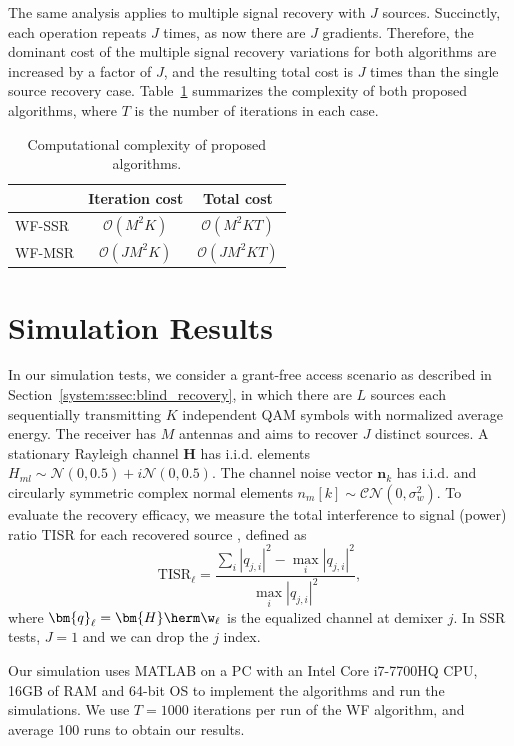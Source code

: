 The same analysis applies to multiple signal recovery with $J$ sources. 
Succinctly, each operation repeats $J$ times, as now there are $J$ gradients. 
Therefore, the dominant cost of the multiple signal recovery variations for both algorithms 
are increased by a factor of $J$, and the resulting total cost is $J$ times than the single source recovery case. 
Table~\ref{wfcma:table:complexity} summarizes the complexity of both proposed algorithms, where $T$ is the number of iterations in each case.
\begin{table}[htb]
\caption{Computational complexity of proposed algorithms.}\label{wfcma:table:complexity}
\centering
\begin{tabular}{l|cc}
	& Iteration cost & Total cost\\\hline
	WF-SSR&  $\mathcal{O}(M^2 K)$  & $\mathcal{O}(M^2 K T)$  \\
	WF-MSR&  $\mathcal{O}(JM^2K)$  & $\mathcal{O}(JM^2KT)$  \\
\end{tabular}
\end{table}

\section{Simulation Results} \label{wfcma:Simulations}
In our simulation tests, we consider a grant-free access scenario as described in Section~\ref{system:ssec:blind_recovery}, in which there are $L$ sources each sequentially transmitting $K$ independent QAM symbols with normalized average energy. 
The receiver has $M$ antennas and aims to recover $J$ distinct sources.
A stationary Rayleigh channel $\bm{H}$ has i.i.d. elements $H_{ml}\sim\mathcal{N}(0,0.5)+i\mathcal{N}(0,0.5)$.
The channel noise vector $\bm{n}_k$ has i.i.d. and circularly symmetric complex normal elements  $n_m[k]\sim \mathcal{CN}(0,\sigma_w^2)$.
To evaluate the recovery efficacy, we measure the total interference to signal (power) ratio TISR for each recovered source \cite{Ding2000}, defined as
\begin{equation}
\mathrm{TISR}_{\ell}=\frac{\sum_i |q_{j,i}|^2- \max_i |q_{j,i}|^2}{\max_i |q_{j,i}|^2}, \label{wfcma:eqn:totalinterferenceMSR}
\end{equation}
where  $\bm{q}_{\ell} = \bm{H}\herm\w_{\ell}$ is the equalized channel at demixer $j$. 
In SSR tests, $J=1$ and we can drop the $j$ index.

Our simulation uses MATLAB on a PC with an Intel Core i7-7700HQ CPU, 16GB of RAM and 64-bit OS to implement the algorithms and run the simulations.
We use $T=1000$ iterations per run of the WF algorithm, and average 100 runs to obtain our results.


